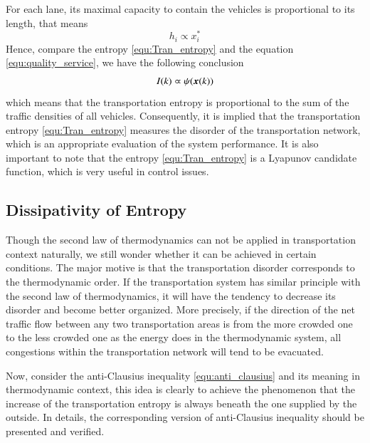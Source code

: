 \documentclass[preprint,authoryear,12pt]{elsarticle}
\renewcommand{\vec}[1]{\mbox{\boldmath$#1$}}
\begin{document}
For each lane, its maximal capacity to contain the vehicles is
proportional to its length, that means
\begin{equation}\label{equ:proportional_l_x}
h_i \varpropto x_i^*
\end{equation}
Hence, compare the entropy \eqref{equ:Tran_entropy} and the equation
\eqref{equ:quality_service}, we have the following conclusion
\begin{equation}\label{equ:conclusion_quality}
I(k) \varpropto \psi(\vec{x}(k))
\end{equation}
which means that the transportation entropy is proportional to the
sum of the traffic densities of all vehicles. Consequently, it is
implied that the transportation entropy \eqref{equ:Tran_entropy}
measures the disorder of the transportation network, which is an
appropriate evaluation of the system performance. It is also
important to note that the entropy \eqref{equ:Tran_entropy} is a
Lyapunov candidate function, which is very useful in control issues.

\subsection{Dissipativity of Entropy}

Though the second law of thermodynamics can not be applied in
transportation context naturally, we still wonder whether it can be
achieved in certain conditions. The major motive is that the
transportation disorder corresponds to the thermodynamic order. If
the transportation system has similar principle with the second law
of thermodynamics, it will have the tendency to decrease its disorder
and become better organized. More precisely, if the direction of the
net traffic flow between any two transportation areas is from the
more crowded one to the less crowded one as the energy does in the
thermodynamic system, all congestions within the transportation
network will tend to be evacuated.

Now, consider the anti-Clausius inequality \eqref{equ:anti_clausius}
and its meaning in thermodynamic context, this idea is clearly to
achieve the phenomenon that the increase of the transportation
entropy is always beneath the one supplied by the outside. In
details, the corresponding version of anti-Clausius inequality should
be presented and verified.
\end{document}
